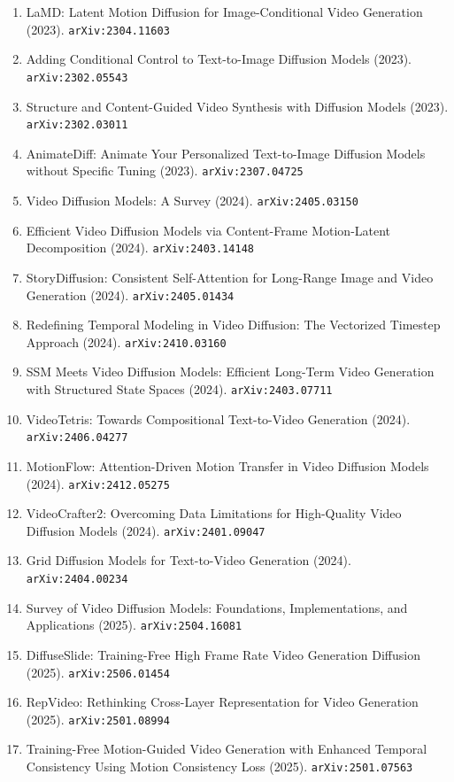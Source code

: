 \documentclass[11pt]{article}
\begin{document}
\begin{enumerate}
  \item LaMD: Latent Motion Diffusion for Image-Conditional Video Generation (2023). \texttt{arXiv:2304.11603}
  \item Adding Conditional Control to Text-to-Image Diffusion Models (2023). \texttt{arXiv:2302.05543}
  \item Structure and Content-Guided Video Synthesis with Diffusion Models (2023). \texttt{arXiv:2302.03011}
  \item AnimateDiff: Animate Your Personalized Text-to-Image Diffusion Models
  without Specific Tuning (2023). \texttt{arXiv:2307.04725}
  \item Video Diffusion Models: A Survey (2024). \texttt{arXiv:2405.03150}
  \item Efficient Video Diffusion Models via Content-Frame Motion-Latent
  Decomposition (2024). \texttt{arXiv:2403.14148}
  \item StoryDiffusion: Consistent Self-Attention for Long-Range Image and Video
  Generation (2024). \texttt{arXiv:2405.01434}
  \item Redefining Temporal Modeling in Video Diffusion: The Vectorized Timestep
  Approach (2024). \texttt{arXiv:2410.03160}
  \item SSM Meets Video Diffusion Models: Efficient Long-Term Video Generation
  with Structured State Spaces (2024). \texttt{arXiv:2403.07711}
  \item VideoTetris: Towards Compositional Text-to-Video Generation (2024). \texttt{arXiv:2406.04277}
  \item MotionFlow: Attention-Driven Motion Transfer in Video Diffusion Models (2024). \texttt{arXiv:2412.05275}
  \item VideoCrafter2: Overcoming Data Limitations for High-Quality Video
  Diffusion Models (2024). \texttt{arXiv:2401.09047}
  \item Grid Diffusion Models for Text-to-Video Generation (2024). \texttt{arXiv:2404.00234}
  \item Survey of Video Diffusion Models: Foundations, Implementations, and Applications (2025). \texttt{arXiv:2504.16081}
  \item DiffuseSlide: Training-Free High Frame Rate Video Generation Diffusion (2025). \texttt{arXiv:2506.01454}
  \item RepVideo: Rethinking Cross-Layer Representation for Video Generation (2025). \texttt{arXiv:2501.08994}
  \item Training-Free Motion-Guided Video Generation with Enhanced Temporal
  Consistency Using Motion Consistency Loss (2025). \texttt{arXiv:2501.07563}

\end{enumerate}
\end{document}

